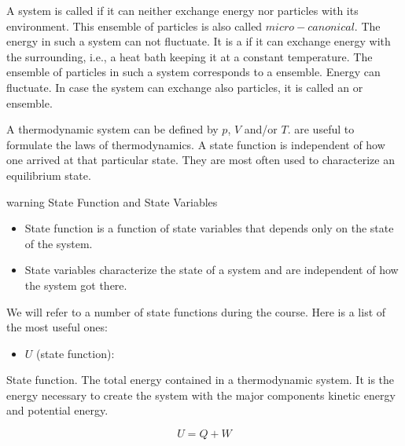 \documentclass[letterpaper,10pt,english]{sphinxmanual}
\begin{document}
\sphinxAtStartPar
A system is called  if it can neither exchange energy nor particles with its environment. This ensemble of particles is also called \(micro-canonical\). The energy in such a system can not fluctuate. It is a  if it can exchange energy with the surrounding, i.e., a heat bath keeping it at a constant temperature. The ensemble of particles in such a system corresponds to a  ensemble. Energy can fluctuate. In case the system can exchange also particles, it is
called an  or  ensemble.

\sphinxAtStartPar
A thermodynamic system can be defined by  \(p\), \(V\) and/or \(T\).  are useful to formulate the laws of thermodynamics. A state function is independent of how one arrived at that particular state. They are most often used to characterize an equilibrium state.

\begin{sphinxadmonition}{warning}{}\unskip
\sphinxAtStartPar
{} State Function and State Variables
\begin{itemize}
\item {} 
\sphinxAtStartPar
State function is a function of state variables that depends only on the state of the system.

\item {} 
\sphinxAtStartPar
State variables characterize the state of a system and are independent of how the system got there.

\end{itemize}
\end{sphinxadmonition}

\sphinxAtStartPar
We will refer to a number of state functions during the course. Here is a list of the most useful ones:
\begin{itemize}
\item {} 
\sphinxAtStartPar
{} \(U\) (state function):

\end{itemize}

\sphinxAtStartPar
State function. The total energy contained in a thermodynamic system. It is the energy necessary to create the system with the major components kinetic energy and potential energy.

\sphinxAtStartPar
\begin{equation}
U=Q+W
\end{equation}
\end{document}
